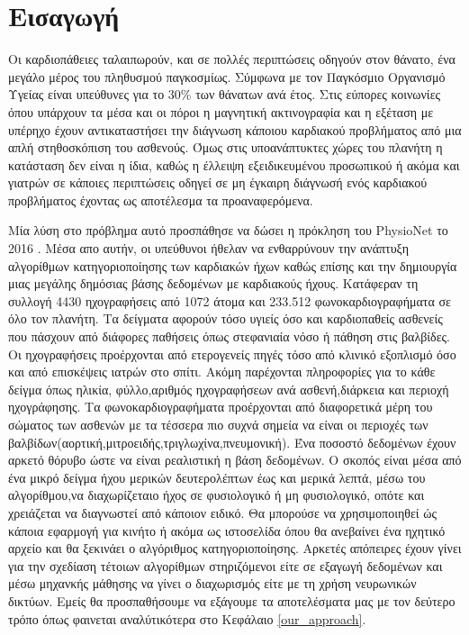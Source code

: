 \section{Εισαγωγή}
Οι καρδιοπάθειες ταλαιπωρούν, και σε πολλές περιπτώσεις οδηγούν στον θάνατο, ένα
μεγάλο μέρος του πληθυσμού παγκοσμίως. Σύμφωνα με τον Παγκόσμιο Οργανισμό Υγείας
είναι υπεύθυνες για το 30\% των θάνατων ανά έτος. Στις εύπορες κοινωνίες όπου
υπάρχουν τα μέσα και οι πόροι η μαγνητική ακτινογραφία και η εξέταση με υπέρηχο
έχουν αντικαταστήσει την διάγνωση κάποιου καρδιακού προβλήματος από μια απλή
στηθοσκόπιση του ασθενούς. Όμως στις υποανάπτυκτες χώρες του πλανήτη η κατάσταση
δεν είναι η ίδια, καθώς η έλλειψη εξειδικευμένου προσωπικού ή ακόμα και γιατρών
σε κάποιες περιπτώσεις οδηγεί σε μη έγκαιρη διάγνωσή ενός καρδιακού προβλήματος
έχοντας ως αποτέλεσμα τα προαναφερόμενα.

Μία λύση στο πρόβλημα αυτό προσπάθησε να δώσει η πρόκληση του PhysioNet το 2016
\cite{clifford2016classification}. Μέσα απο αυτήν, οι υπεύθυνοι ήθελαν να
ενθαρρύνουν την ανάπτυξη αλγορίθμων κατηγοριοποίησης των καρδιακών ήχων καθώς
επίσης και την δημιουργία μιας μεγάλης δημόσιας βάσης δεδομένων με καρδιακούς
ήχους. Κατάφεραν τη συλλογή 4430 ηχογραφήσεις από 1072 άτομα και 233.512
φωνοκαρδιογραφήματα σε όλο τον πλανήτη.  Τα δείγματα αφορούν τόσο υγιείς όσο και
καρδιοπαθείς ασθενείς που πάσχουν από διάφορες παθήσεις όπως στεφανιαία νόσο ή
πάθηση στις βαλβίδες. Οι ηχογραφήσεις προέρχονται από ετερογενείς πηγές τόσο από
κλινικό εξοπλισμό όσο και από επισκέψεις ιατρών στο σπίτι. Ακόμη παρέχονται
πληροφορίες για το κάθε δείγμα όπως ηλικία, φύλλο,αριθμός ηχογραφήσεων ανά
ασθενή,διάρκεια και περιοχή ηχογράφησης. Τα φωνοκαρδιογραφήματα προέρχονται από
διαφορετικά μέρη του σώματος των ασθενών με τα τέσσερα πιο συχνά σημεία να είναι
οι περιοχές των βαλβίδων(αορτική,μιτροειδής,τριγλωχίνα,πνευμονική). Ένα ποσοστό
δεδομένων έχουν αρκετό θόρυβο ώστε να είναι ρεαλιστική η βάση δεδομένων.  Ο
σκοπός είναι μέσα από ένα μικρό δείγμα ήχου μερικών δευτερολέπτων έως και μερικά
λεπτά, μέσω του αλγορίθμου,να διαχωρίζεταιο ήχος σε φυσιολογικό ή μη
φυσιολογικό, οπότε και χρειάζεται να διαγνωστεί από κάποιον ειδικό. Θα μπορούσε
να χρησιμοποιηθεί ώς κάποια εφαρμογή για κινήτο ή ακόμα ως ιστοσελίδα όπου θα
ανεβαίνει ένα ηχητικό αρχείο και θα ξεκινάει ο αλγόριθμος κατηγοριοποίησης.
Αρκετές απόπειρες έχουν γίνει για την σχεδίαση τέτοιων αλγορίθμων στηριζόμενοι
είτε σε εξαγωγή δεδομένων και μέσω μηχανκής μάθησης να γίνει ο διαχωρισμός είτε
με τη χρήση νευρωνικών δικτύων. Εμείς θα προσπαθήσουμε να εξάγουμε τα
αποτελέσματα μας με τον δεύτερο τρόπο όπως φαινεται αναλύτικότερα στο Κεφάλαιο
\ref{our_approach}.

